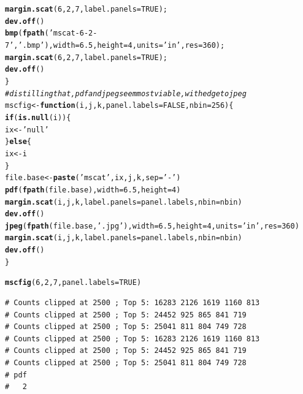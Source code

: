 \documentclass{article}\usepackage[]{graphicx}\usepackage[]{color}
\makeatletter
\newcommand{\hlnum}[1]{\textcolor[rgb]{0.686,0.059,0.569}{#1}}%
\newcommand{\hlstr}[1]{\textcolor[rgb]{0.192,0.494,0.8}{#1}}%
\newcommand{\hlcom}[1]{\textcolor[rgb]{0.678,0.584,0.686}{\textit{#1}}}%
\newcommand{\hlstd}[1]{\textcolor[rgb]{0.345,0.345,0.345}{#1}}%
\newcommand{\hlkwa}[1]{\textcolor[rgb]{0.161,0.373,0.58}{\textbf{#1}}}%
\newcommand{\hlkwb}[1]{\textcolor[rgb]{0.69,0.353,0.396}{#1}}%
\newcommand{\hlkwc}[1]{\textcolor[rgb]{0.333,0.667,0.333}{#1}}%
\newcommand{\hlkwd}[1]{\textcolor[rgb]{0.737,0.353,0.396}{\textbf{#1}}}%
\newenvironment{kframe}{%
 \def\at@end@of@kframe{}%
 \ifinner\ifhmode%
  \def\at@end@of@kframe{\end{minipage}}%
  \begin{minipage}{\columnwidth}%
 \fi\fi%
 \def\FrameCommand##1{\hskip\@totalleftmargin \hskip-\fboxsep
 \colorbox{shadecolor}{##1}\hskip-\fboxsep
     \hskip-\linewidth \hskip-\@totalleftmargin \hskip\columnwidth}%
 \MakeFramed {\advance\hsize-\width
   \@totalleftmargin\z@ \linewidth\hsize
   \@setminipage}}%
 {\par\unskip\endMakeFramed%
 \at@end@of@kframe}
\newenvironment{knitrout}{}{} %
\makeatother
\begin{document}
\begin{knitrout}
\begin{kframe}
\begin{alltt}
  \hlkwd{margin.scat}\hlstd{(}\hlnum{6}\hlstd{,}\hlnum{2}\hlstd{,}\hlnum{7}\hlstd{,}\hlkwc{label.panels}\hlstd{=}\hlnum{TRUE}\hlstd{);}
  \hlkwd{dev.off}\hlstd{()}
  \hlkwd{bmp}\hlstd{(}\hlkwd{fpath}\hlstd{(}\hlstr{'mscat-6-2-7'}\hlstd{,}\hlstr{'.bmp'}\hlstd{),} \hlkwc{width}\hlstd{=}\hlnum{6.5}\hlstd{,} \hlkwc{height}\hlstd{=}\hlnum{4}\hlstd{,}\hlkwc{units}\hlstd{=}\hlstr{'in'}\hlstd{,}\hlkwc{res}\hlstd{=}\hlnum{360}\hlstd{);}
  \hlkwd{margin.scat}\hlstd{(}\hlnum{6}\hlstd{,}\hlnum{2}\hlstd{,}\hlnum{7}\hlstd{,}\hlkwc{label.panels}\hlstd{=}\hlnum{TRUE}\hlstd{);}
  \hlkwd{dev.off}\hlstd{()}
\hlstd{\}}
\hlcom{#distilling that, pdf and jpeg seem most viable, with edge to jpeg}
\hlstd{mscfig} \hlkwb{<-} \hlkwa{function}\hlstd{(}\hlkwc{i}\hlstd{,}\hlkwc{j}\hlstd{,}\hlkwc{k}\hlstd{,}\hlkwc{panel.labels}\hlstd{=}\hlnum{FALSE}\hlstd{,}\hlkwc{nbin}\hlstd{=}\hlnum{256}\hlstd{)\{}
  \hlkwa{if}\hlstd{(}\hlkwd{is.null}\hlstd{(i))\{}
    \hlstd{ix} \hlkwb{<-} \hlstr{'null'}
  \hlstd{\}} \hlkwa{else} \hlstd{\{}
    \hlstd{ix} \hlkwb{<-} \hlstd{i}
  \hlstd{\}}
  \hlstd{file.base} \hlkwb{<-} \hlkwd{paste}\hlstd{(}\hlstr{'mscat'}\hlstd{,ix,j,k,}\hlkwc{sep}\hlstd{=}\hlstr{'-'}\hlstd{)}
  \hlkwd{pdf}\hlstd{(}\hlkwd{fpath}\hlstd{(file.base),} \hlkwc{width}\hlstd{=}\hlnum{6.5}\hlstd{,} \hlkwc{height}\hlstd{=}\hlnum{4}\hlstd{)}
  \hlkwd{margin.scat}\hlstd{(i,j,k,}\hlkwc{label.panels}\hlstd{=panel.labels,}\hlkwc{nbin}\hlstd{=nbin)}
  \hlkwd{dev.off}\hlstd{()}
  \hlkwd{jpeg}\hlstd{(}\hlkwd{fpath}\hlstd{(file.base,}\hlstr{'.jpg'}\hlstd{),} \hlkwc{width}\hlstd{=}\hlnum{6.5}\hlstd{,} \hlkwc{height}\hlstd{=}\hlnum{4}\hlstd{,} \hlkwc{units}\hlstd{=}\hlstr{'in'}\hlstd{,} \hlkwc{res}\hlstd{=}\hlnum{360}\hlstd{)}
  \hlkwd{margin.scat}\hlstd{(i,j,k,}\hlkwc{label.panels}\hlstd{=panel.labels,}\hlkwc{nbin}\hlstd{=nbin)}
  \hlkwd{dev.off}\hlstd{()}
\hlstd{\}}
\end{alltt}
\end{kframe}
\end{knitrout}
\begin{knitrout}\footnotesize
{}\color{fgcolor}\begin{kframe}
\begin{alltt}
\hlkwd{mscfig}\hlstd{(}\hlnum{6}\hlstd{,}\hlnum{2}\hlstd{,}\hlnum{7}\hlstd{,}\hlkwc{panel.labels} \hlstd{=} \hlnum{TRUE}\hlstd{)}
\end{alltt}
\begin{verbatim}
# Counts clipped at 2500 ; Top 5: 16283 2126 1619 1160 813
# Counts clipped at 2500 ; Top 5: 24452 925 865 841 719
# Counts clipped at 2500 ; Top 5: 25041 811 804 749 728
# Counts clipped at 2500 ; Top 5: 16283 2126 1619 1160 813
# Counts clipped at 2500 ; Top 5: 24452 925 865 841 719
# Counts clipped at 2500 ; Top 5: 25041 811 804 749 728
# pdf 
#   2
\end{verbatim}
\end{kframe}
\end{knitrout}
\end{document}
